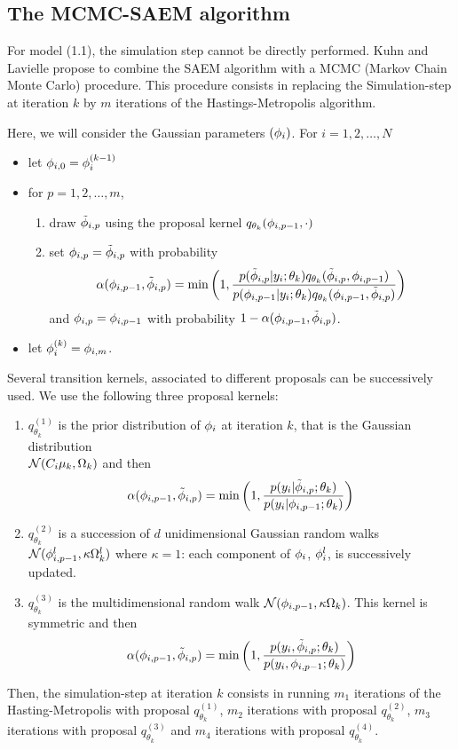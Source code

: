 \subsection{The MCMC-SAEM algorithm}
For model (1.1), the simulation step cannot be directly performed. Kuhn and Lavielle \cite{Kuhn01} propose to combine the SAEM algorithm with a MCMC (Markov Chain Monte Carlo) procedure. This procedure consists in replacing the Simulation-step at iteration $k$ by $m$ iterations of the Hastings-Metropolis algorithm.

Here, we will consider the Gaussian parameters $({{\phi}_i})$. For $i=1,2,\ldots,N$
\begin{itemize}
\item let ${\phi}_{i,0}={\phi}_{i}^{(k-1)}$
\item for $p=1,2,\ldots,m$,
\begin{enumerate}
\item draw $ \tilde{{\phi}}_{i,p}$ using the proposal kernel
$ q_{\theta_k}( {\phi}_{i,p-1} ,\cdot) $
\item set $ {\phi}_{i,p} =  \tilde{{\phi}}_{i,p} $ with probability
$$ \alpha( {\phi}_{i,p-1} ,  \tilde{{\phi}}_{i,p} ) = \min \left(1, \frac
{ p( \tilde{{\phi}}_{i,p} |y_i;\theta_k) q_{\theta_k}(\tilde{{\phi}}_{i,p} , {\phi}_{i,p-1} )}
{ p( {\phi}_{i,p-1} |y_i;\theta_k) q_{\theta_k}({\phi}_{i,p-1} ,\tilde{{\phi}}_{i,p} )} \right)$$ and
${\phi}_{i,p} =  {\phi}_{i,p-1}$ with probability $1- \alpha( {\phi}_{i,p-1} ,  \tilde{{\phi}}_{i,p} ) $.
\end{enumerate}
\item let ${\phi}_i^{(k)} =  {\phi}_{i,m}$.
 \end{itemize}

Several transition kernels, associated to different proposals can be successively used. We use the following three proposal kernels:

\begin{enumerate}
\item $q_{\theta_k}^{(1)}$  is the prior distribution of ${\phi}_i$ at iteration $k$, that is the Gaussian distribution \\
${\cal N}(C_i\fixed_effect_k,\IIV_k)$ and then
$$ \alpha( {\phi}_{i,p-1} ,  \tilde{{\phi}}_{i,p} ) = \min \left(1, \frac{ p( y_i|\tilde{{\phi}}_{i,p};\theta_k) } { p( y_i|{\phi}_{i,p-1};\theta_k) } \right)$$
\item $q_{\theta_k}^{(2)}$ is a succession of $d$ unidimensional Gaussian random walks ${\cal N}( {\phi}^l_{i,p-1} , \kappa{\Omega}^l_k)$ where $\kappa=1$: each component of ${\phi}_i$, ${\phi}^l_i$, is successively updated.
\item $q_{\theta_k}^{(3)}$ is the multidimensional random walk ${\cal N}( {\phi}_{i,p-1} , \kappa{\Omega}_k)$. This kernel is symmetric and then 
$$ \alpha( {\phi}_{i,p-1} ,  \tilde{{\phi}}_{i,p} ) = \min \left(1, \frac{ p( y_i,\tilde{{\phi}}_{i,p};\theta_k) } { p( y_i,{\phi}_{i,p-1};\theta_k) } \right)$$
\end{enumerate}
Then, the simulation-step at iteration $k$ consists in running $m_1$ iterations of the Hasting-Metropolis with proposal $q_{\theta_k}^{(1)}$, $m_2$ iterations with proposal $q_{\theta_k}^{(2)}$, $m_3$ iterations with proposal $q_{\theta_k}^{(3)}$ and $m_4$ iterations with proposal $q_{\theta_k}^{(4)}$.


